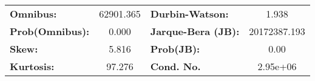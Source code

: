\begin{center}
\begin{tabular}{lccccc}
\end{tabular}
\begin{tabular}{lclc}
\textbf{Omnibus:}       & 62901.365 & \textbf{  Durbin-Watson:     } &      1.938    \\
\textbf{Prob(Omnibus):} &    0.000  & \textbf{  Jarque-Bera (JB):  } & 20172387.193  \\
\textbf{Skew:}          &    5.816  & \textbf{  Prob(JB):          } &       0.00    \\
\textbf{Kurtosis:}      &   97.276  & \textbf{  Cond. No.          } &   2.95e+06    \\
\bottomrule
\end{tabular}
\end{center}
\break